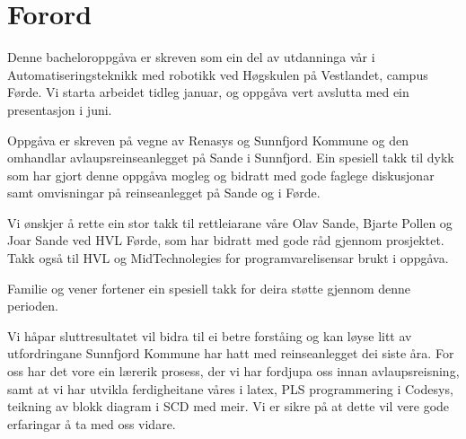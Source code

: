 \chapter{Forord}
\thispagestyle{romanpages}

Denne bacheloroppgåva er skreven som ein del av utdanninga vår i Automatiseringsteknikk med robotikk ved Høgskulen på Vestlandet, campus Førde.
Vi starta arbeidet tidleg januar, og oppgåva vert avslutta med ein presentasjon i juni.

Oppgåva er skreven på vegne av \gls{Renasys}\citep{Renasys} og \gls{Sunnfjord Kommune}\citep{SunnfjordKommune} og den omhandlar 
avlaupsreinseanlegget på Sande i Sunnfjord. 
Ein spesiell takk til dykk som har gjort denne oppgåva mogleg og
bidratt med gode faglege diskusjonar samt omvisningar på reinseanlegget på Sande og i Førde.

Vi ønskjer å rette ein stor takk til rettleiarane våre Olav Sande, Bjarte Pollen og Joar Sande ved \gls{HVL} Førde, som har bidratt med gode råd gjennom prosjektet.
Takk også til \gls{HVL} og MidTechnolegies\citep{MIDT} for programvarelisensar brukt i oppgåva.

Familie og vener fortener ein spesiell takk for deira støtte gjennom denne perioden.

Vi håpar sluttresultatet vil bidra til ei betre forståing og kan løyse litt av utfordringane \gls{Sunnfjord Kommune} har hatt med reinseanlegget dei siste åra.
For oss har det vore ein lærerik prosess, der vi har fordjupa oss innan avlaupsreisning, samt at vi har utvikla ferdigheitane våres i \gls{latex}, 
\gls{PLS} programmering i \gls{Codesys}, teikning av blokk diagram i \gls{SCD} med meir. Vi er sikre på at dette vil vere gode erfaringar å ta med oss vidare.
